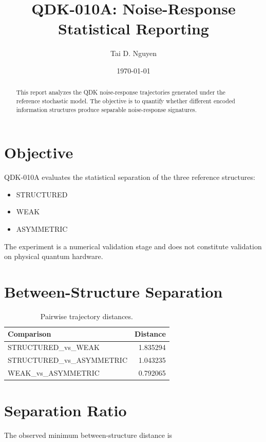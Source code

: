 \documentclass[11pt]{article}
\title{QDK-010A: Noise-Response Statistical Reporting}
\author{Tai D. Nguyen}
\date{\today}
\begin{document}
\maketitle

\begin{abstract}
This report analyzes the QDK noise-response trajectories generated
under the reference stochastic model. The objective is to quantify
whether different encoded information structures produce separable
noise-response signatures.
\end{abstract}

\section{Objective}

QDK-010A evaluates the statistical separation of the three reference
structures:

\begin{itemize}
\item STRUCTURED
\item WEAK
\item ASYMMETRIC
\end{itemize}

The experiment is a numerical validation stage and does not constitute
validation on physical quantum hardware.

\section{Between-Structure Separation}

\begin{table}[h]
\centering
\begin{tabular}{lr}
\toprule
Comparison & Distance \\
\midrule
STRUCTURED\_vs\_WEAK & 1.835294 \\
STRUCTURED\_vs\_ASYMMETRIC & 1.043235 \\
WEAK\_vs\_ASYMMETRIC & 0.792065 \\
\bottomrule
\end{tabular}
\caption{Pairwise trajectory distances.}
\end{table}

\section{Separation Ratio}

The observed minimum between-structure distance is
\end{document}
